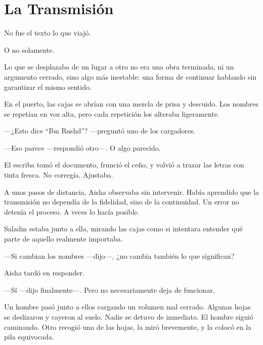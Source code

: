 
\chapter*{La Transmisión}


No fue el texto lo que viajó.

O no solamente.

Lo que se desplazaba de un lugar a otro no era una obra terminada, ni un
argumento cerrado, sino algo más inestable: una forma de continuar hablando
sin garantizar el mismo sentido.

En el puerto, las cajas se abrían con una mezcla de prisa y descuido. Los
nombres se repetían en voz alta, pero cada repetición los alteraba ligeramente.

---¿Esto dice ``Ibn Rushd''? ---preguntó uno de los cargadores.

---Eso parece ---respondió otro---. O algo parecido.

El escriba tomó el documento, frunció el ceño, y volvió a trazar las letras
con tinta fresca. No corregía. Ajustaba.

A unos pasos de distancia, Aisha observaba sin intervenir. Había aprendido
que la transmisión no dependía de la fidelidad, sino de la continuidad. Un
error no detenía el proceso. A veces lo hacía posible.

Saladin estaba junto a ella, mirando las cajas como si intentara entender qué
parte de aquello realmente importaba.

---Si cambian los nombres ---dijo---, ¿no cambia también lo que significan?

Aisha tardó en responder.

---Sí ---dijo finalmente---. Pero no necesariamente deja de funcionar.

Un hombre pasó junto a ellos cargando un volumen mal cerrado. Algunas hojas
se deslizaron y cayeron al suelo. Nadie se detuvo de inmediato. El hombre
siguió caminando. Otro recogió una de las hojas, la miró brevemente, y la
colocó en la pila equivocada.


